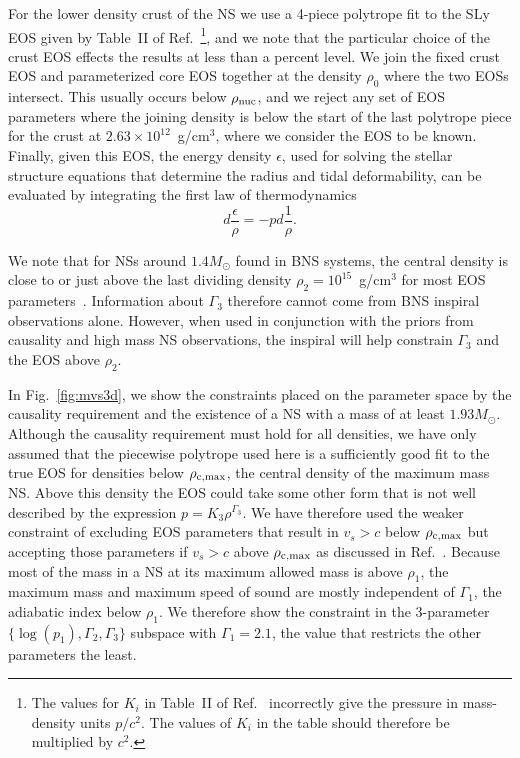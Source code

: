 \documentclass[twocolumn,prd,amssymb,aps,nofootinbib,showpacs,epsf]{revtex4}
\begin{document}
For the lower density crust of the NS we use a 4-piece polytrope fit to the SLy EOS given by Table~II of Ref.~\cite{ReadLackey2009}\footnote{The values for $K_i$ in Table~II of Ref.~\cite{ReadLackey2009} incorrectly give the pressure in mass-density units $p/c^2$. The values of $K_i$ in the table should therefore be multiplied by $c^2$.}, and we note that the particular choice of the crust EOS effects the results at less than a percent level. We join the fixed crust EOS and parameterized core EOS together at the density $\rho_0$ where the two EOSs intersect. This usually occurs below $\rho_{\rm nuc}$, and we reject any set of EOS parameters where the joining density is below the start of the last polytrope piece for the crust at $2.63\times 10^{12}$~g/cm$^3$, where we consider the EOS to be known. Finally, given this EOS, the energy density $\epsilon$, used for solving the stellar structure equations that determine the radius and tidal deformability, can be evaluated by integrating the first law of thermodynamics
\begin{equation}
d\frac{\epsilon}{\rho} = - p d\frac{1}{\rho}.
\end{equation}

We note that for NSs around $1.4M_\odot$ found in BNS systems, the central density is close to or just above the last dividing density $\rho_2 = 10^{15}$~g/cm$^3$ for most EOS parameters~\cite{ReadLackey2009}. Information about $\Gamma_3$ therefore cannot come from BNS inspiral observations alone. However, when used in conjunction with the priors from causality and high mass NS observations, the inspiral will help constrain $\Gamma_3$ and the EOS above $\rho_2$.

In Fig.~\ref{fig:mvs3d}, we show the constraints placed on the parameter space by the causality requirement and the existence of a NS with a mass of at least $1.93M_\odot$. Although the causality requirement must hold for all densities, we have only assumed that the piecewise polytrope used here is a sufficiently good fit to the true EOS for densities below $\rho_{\rm c, max}$, the central density of the maximum mass NS. Above this density the EOS could take some other form that is not well described by the expression $p = K_3 \rho^{\Gamma_3}$. We have therefore used the weaker constraint of excluding EOS parameters that result in $v_s > c$ below $\rho_{\rm c, max}$ but accepting those parameters if $v_s > c$ above $\rho_{\rm c, max}$ as discussed in Ref.~\cite{ReadLackey2009}. Because most of the mass in a NS at its maximum allowed mass is above $\rho_1$, the maximum mass and maximum speed of sound are mostly independent of $\Gamma_1$, the adiabatic index below $\rho_1$. We therefore show the constraint in the 3-parameter $\{\log(p_1), \Gamma_2, \Gamma_3\}$ subspace with $\Gamma_1 = 2.1$, the value that restricts the other parameters the least. 
\end{document}
